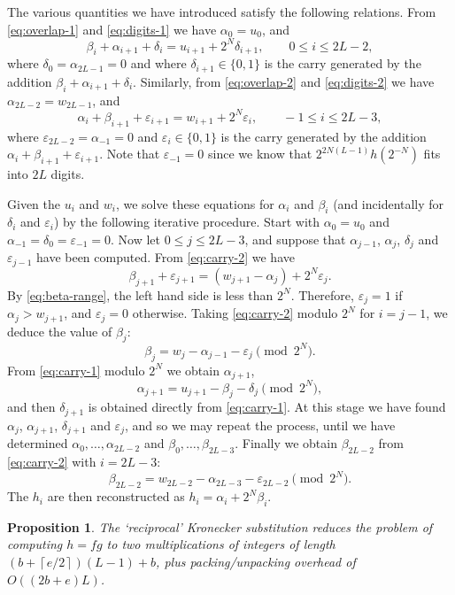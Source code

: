 \documentclass{amsart}
\newcommand{\ep}{\varepsilon}
\newcommand{\ceil}[1]{\left\lceil{#1}\right\rceil}
\newtheorem{prop}[thm]{Proposition}
\theoremstyle{definition}
\theoremstyle{remark}
\begin{document}
The various quantities we have introduced satisfy the following relations. From \eqref{eq:overlap-1} and \eqref{eq:digits-1} we have $\alpha_0 = u_0$, and
\begin{equation}
\label{eq:carry-1}
 \beta_i + \alpha_{i+1} + \delta_i = u_{i+1} + 2^N \delta_{i+1},  \qquad 0 \leq i \leq 2L-2,
\end{equation}
where $\delta_0 = \alpha_{2L-1} = 0$ and where $\delta_{i+1} \in \{0, 1\}$ is the carry generated by the addition $\beta_i + \alpha_{i+1} + \delta_i$. Similarly, from \eqref{eq:overlap-2} and \eqref{eq:digits-2} we have $\alpha_{2L-2} = w_{2L-1}$, and
\begin{equation}
\label{eq:carry-2}
 \alpha_i + \beta_{i+1} + \ep_{i+1} = w_{i+1} + 2^N \ep_i, \qquad -1 \leq i \leq 2L-3,
\end{equation}
where $\ep_{2L-2} = \alpha_{-1} = 0$ and $\ep_i \in \{0, 1\}$ is the carry generated by the addition $\alpha_i + \beta_{i+1} + \ep_{i+1}$. Note that $\ep_{-1} = 0$ since we know that $2^{2N(L-1)} h(2^{-N})$ fits into $2L$ digits.

Given the $u_i$ and $w_i$, we solve these equations for $\alpha_i$ and $\beta_i$ (and incidentally for $\delta_i$ and $\ep_i$) by the following iterative procedure. Start with $\alpha_0 = u_0$ and $\alpha_{-1} = \delta_0 = \ep_{-1} = 0$. Now let $0 \leq j \leq 2L - 3$, and suppose that $\alpha_{j-1}$, $\alpha_j$, $\delta_j$ and $\ep_{j-1}$ have been computed. From \eqref{eq:carry-2} we have
 \[ \beta_{j+1} + \ep_{j+1} = (w_{j+1} - \alpha_j) + 2^N \ep_j. \]
By \eqref{eq:beta-range}, the left hand side is less than $2^N$. Therefore, $\ep_j = 1$ if $\alpha_j > w_{j+1}$, and $\ep_j = 0$ otherwise. Taking \eqref{eq:carry-2} modulo $2^N$ for $i = j - 1$, we deduce the value of $\beta_j$:
 \[ \beta_j = w_j - \alpha_{j-1} - \ep_j \pmod{2^N}. \]
From \eqref{eq:carry-1} modulo $2^N$ we obtain $\alpha_{j+1}$,
 \[ \alpha_{j+1} = u_{j+1} - \beta_j - \delta_j  \pmod{2^N}, \]
and then $\delta_{j+1}$ is obtained directly from \eqref{eq:carry-1}. At this stage we have found $\alpha_j$, $\alpha_{j+1}$, $\delta_{j+1}$ and $\ep_j$, and so we may repeat the process, until we have determined $\alpha_0, \ldots, \alpha_{2L-2}$ and $\beta_0, \ldots, \beta_{2L-3}$. Finally we obtain $\beta_{2L-2}$ from \eqref{eq:carry-2} with $i = 2L-3$:
 \[  \beta_{2L-2} = w_{2L-2} - \alpha_{2L-3} - \ep_{2L-2} \pmod{2^N}. \]
The $h_i$ are then reconstructed as $h_i = \alpha_i + 2^N \beta_i$.

\begin{prop}
\label{prop:integer-recip-ks}
The `reciprocal' Kronecker substitution reduces the problem of computing $h = fg$ to two multiplications of integers of length $(b+\ceil{e/2})(L-1) + b$, plus packing/unpacking overhead of $O((2b+e)L)$.
\end{prop}
\end{document}
